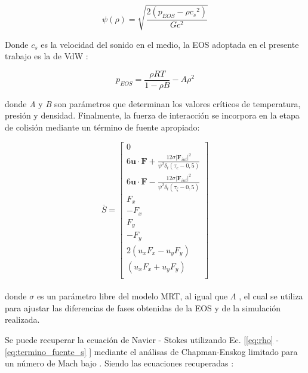 \begin{equation} 
    \psi(\rho) = \sqrt{\frac{2 (p_{EOS} - \rho {c_{s}}^{2})}{G {c}^{2}}}
    \label{eq:psi}
\end{equation}

Donde $c_{s}$ es la velocidad del sonido en el medio, la EOS adoptada en el presente trabajo es la de VdW :

\begin{equation}
    p_{EOS} = \frac{\rho R T}{1- \rho B} - A {\rho}^{2}
\end{equation}

donde \textit{A} y \textit{B} son parámetros que determinan los valores críticos de temperatura, presión y densidad. Finalmente, la fuerza de interacción se incorpora en la etapa de colisión mediante un término de fuente apropiado:

\begin{equation}
    \bar{S} = 
    \left[ \begin{array}{c} 
        0\\
        6 \mathbf{u}\cdot \mathbf{F} + \frac{12 \sigma {|{\mathbf{F}_{int}|}}^{2} }{{\psi}^{2} \delta_{t} (\tau_{e} - 0,5)}\\
        6 \mathbf{u}\cdot \mathbf{F} - \frac{12 \sigma {|{\mathbf{F}_{int}|}}^{2} }{{\psi}^{2} \delta_{t} (\tau_{\zeta } - 0,5)}\\
        F_{x}\\
        -F_{x}\\
        F_{y}\\
        -F_{y}\\
        2(u_{x} F_{x} - u_{y} F_{y} )\\
        (u_{x} F_{x} + u_{y} F_{y} )\\              
    \end{array}
    \right]    
    \label{eq:termino_fuente_s}
\end{equation}
\\
donde $\sigma$ es un parámetro libre del modelo MRT, al igual que $\Lambda$ , el cual se utiliza para ajustar las diferencias de fases obtenidas de la EOS y de la simulación realizada.

Se puede recuperar la ecuación de Navier - Stokes utilizando Ec. [\ref{eq:rho} - \ref{eq:termino_fuente_s} ] mediante el análisas de Chapman-Enskog limitado para un número de Mach bajo \cite{li2013lattice}. Siendo las ecuaciones recuperadas \cite{fogliatto2019simulation} \cite{li2013lattice}:

